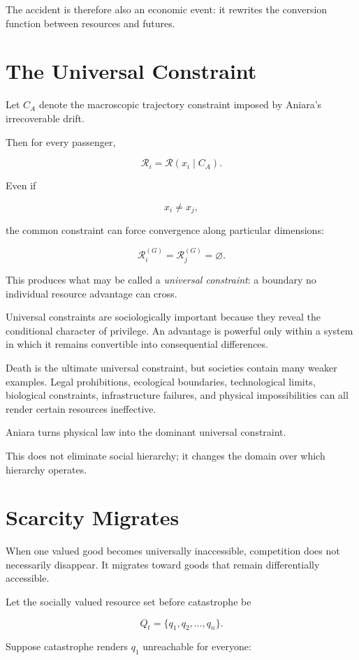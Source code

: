\documentclass[11pt,oneside]{book}
\theoremstyle{definition}
\theoremstyle{remark}
\newcommand{\R}{\mathcal{R}}
\begin{document}
The accident is therefore also an economic event: it rewrites the conversion function between resources and futures.

\section{The Universal Constraint}

Let \(C_A\) denote the macroscopic trajectory constraint imposed by Aniara's irrecoverable drift.

Then for every passenger,

\[
\R_i
=
\R(x_i\mid C_A).
\]

Even if

\[
x_i\neq x_j,
\]

the common constraint can force convergence along particular dimensions:

\[
\R_i^{(G)}
=
\R_j^{(G)}
=
\varnothing.
\]

This produces what may be called a \emph{universal constraint}: a boundary no individual resource advantage can cross.

Universal constraints are sociologically important because they reveal the conditional character of privilege. An advantage is powerful only within a system in which it remains convertible into consequential differences.

Death is the ultimate universal constraint, but societies contain many weaker examples. Legal prohibitions, ecological boundaries, technological limits, biological constraints, infrastructure failures, and physical impossibilities can all render certain resources ineffective.

Aniara turns physical law into the dominant universal constraint.

This does not eliminate social hierarchy; it changes the domain over which hierarchy operates.

\section{Scarcity Migrates}

When one valued good becomes universally inaccessible, competition does not necessarily disappear. It migrates toward goods that remain differentially accessible.

Let the socially valued resource set before catastrophe be

\[
Q_t
=
\{
q_1,q_2,\ldots,q_n
\}.
\]

Suppose catastrophe renders \(q_1\) unreachable for everyone:
\end{document}
